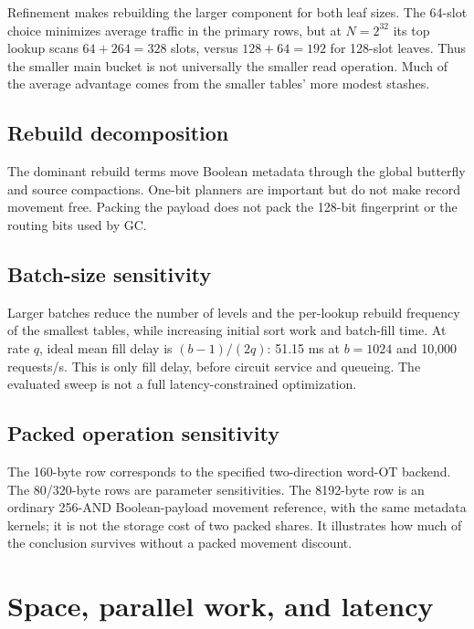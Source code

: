 \documentclass[11pt]{article}
\begin{document}
Refinement makes rebuilding the larger component for both leaf sizes.
The 64-slot choice minimizes average traffic in the primary rows, but at
$N=2^{32}$ its top lookup scans $64+264=328$ slots, versus $128+64=192$
for 128-slot leaves. Thus the smaller main bucket is not universally the
smaller read operation. Much of the average advantage comes from the
smaller tables' more modest stashes.

\subsection{Rebuild decomposition}
The dominant rebuild terms move Boolean metadata through the global
butterfly and source compactions. One-bit planners are important but do not
make record movement free. Packing the payload does not pack the 128-bit
fingerprint or the routing bits used by GC.

\subsection{Batch-size sensitivity}
Larger batches reduce the number of levels and the per-lookup rebuild
frequency of the smallest tables, while increasing initial sort work and
batch-fill time. At rate $q$, ideal mean fill delay is $(b-1)/(2q)$:
51.15 ms at $b=1024$ and 10,000 requests/s. This is only fill delay,
before circuit service and queueing. The evaluated sweep is not a full
latency-constrained optimization.

\subsection{Packed operation sensitivity}
The 160-byte row corresponds to the specified two-direction word-OT
backend. The 80/320-byte rows are parameter sensitivities. The 8192-byte
row is an ordinary 256-AND Boolean-payload movement reference, with the
same metadata kernels; it is not the storage cost of two packed shares.
It illustrates how much of the conclusion survives without a packed
movement discount.

\section{Space, parallel work, and latency}\label{sec:resources}
\end{document}
